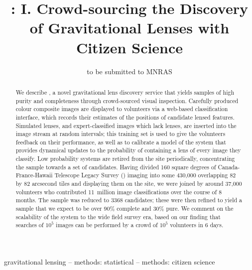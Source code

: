 \documentclass[useAMS,usenatbib,a4paper]{mn2e}
\title[\SW]
{\SW: I. Crowd-sourcing the Discovery of Gravitational Lenses with Citizen Science}
\author[Marshall et al.]{%
  
}
\begin{document}
\date{to be submitted to MNRAS}
\pagerange{\pageref{firstpage}--\pageref{lastpage}}

\maketitle

\label{firstpage}


\begin{abstract}

We describe \SW, a novel gravitational lens discovery service that yields
samples of high purity and completeness through crowd-sourced visual inspection.
Carefully produced colour composite images are displayed to volunteers via a
web-based classification interface, which records their estimates of the positions of
candidate lensed features. Simulated lenses, and expert-classified images which
lack lenses, are inserted into the image stream at random intervals; this
training set is used to give the volunteers feedback on their performance, as
well as to calibrate a model of the system that provides
dynamical updates to the probability of containing a lens
of every image they classify. Low probability systems are
retired from the site periodically, concentrating the sample towards a set of
candidates. Having divided 160 square degrees of Canada-France-Hawaii Telescope
Legacy Survey (\cfhtls) imaging into some 430,000 overlapping 82 by 82 arcsecond
tiles and displaying them on the site, we were joined by around 37,000
volunteers who contributed 11~million image classifications over the course of 8
months. The sample was reduced to 3368 \StageOne candidates; these were then
refined to yield a sample that we expect to be over 90\% complete and 30\% pure.
We comment on the scalability of the \SW system to the wide field survey era,
based on our finding that searches of $10^5$ images can be performed by a
crowd of $10^5$ volunteers in 6 days.
\end{abstract}


\begin{keywords}
  gravitational lensing   --
  methods: statistical    --
  methods: citizen science
\end{keywords}

\setcounter{footnote}{1}
\end{document}
